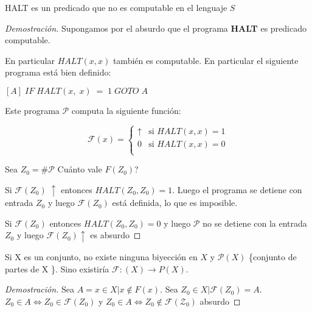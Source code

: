 \begin{theorem}
HALT es un predicado que no es computable en el lenguaje $S$
\end{theorem}
 
\begin{proof}[Demostraci\'on]
Supongamos por el absurdo que el programa \textbf{HALT} es predicado computable. 

En particular $HALT(x, x)$ tambi\'en es computable. En particular el siguiente programa est\'a bien definido:
 
$[A]\;IF\;HALT(x,\;x)\;=\;1\;GOTO\;A$
 
Este programa $\mathcal{P}$ computa la siguiente funci\'on:
 
\[
\mathcal{F}(x) =
\begin{cases}
\uparrow		&\text{si $HALT(x, x) = 1$}		\\
0				&\text{si $HALT(x, x) = 0$}		\\
\end{cases}
\]
 
Sea $Z_0 = \#\mathcal{P}$ Cu\'anto vale $F(Z_0)$?
 
Si $\mathcal{F}(Z_0) \; \uparrow$ entonces $HALT(Z_0,Z_0) = 1$. Luego el programa se detiene con entrada $Z_0$ y luego $\mathcal{F}(Z_0)$ est\'a definida, lo que es imposible.
 
Si $\mathcal{F}(Z_0)$ entonces $HALT(Z_0, Z_0) = 0$ y luego $\mathcal{P}$ no se detiene con la entrada $Z_0$ y luego $\mathcal{F}(Z_0) \uparrow$ es absurdo
 
\end{proof}
 
\begin{definition}
Si X es un conjunto, no existe ninguna biyecci\'on en $X$ y $\mathcal{P}(X)$ \{conjunto de partes de X \}. Sino existir\'ia $\mathcal{F} \colon (X) \rightarrow P(X)$.
\end{definition}
 
\begin{proof}[Demostraci\'on]
Sea $A = { x \in X | x \notin F(x) }$. Sea $Z_0 \in X | \mathcal{F}(Z_0) = A$. $Z_0 \in A \iff Z_0 \in \mathcal{F}(Z_0)$ y $Z_0 \in A \iff Z_0 \notin \mathcal{F(Z_0)}$ absurdo
\end{proof}
 
